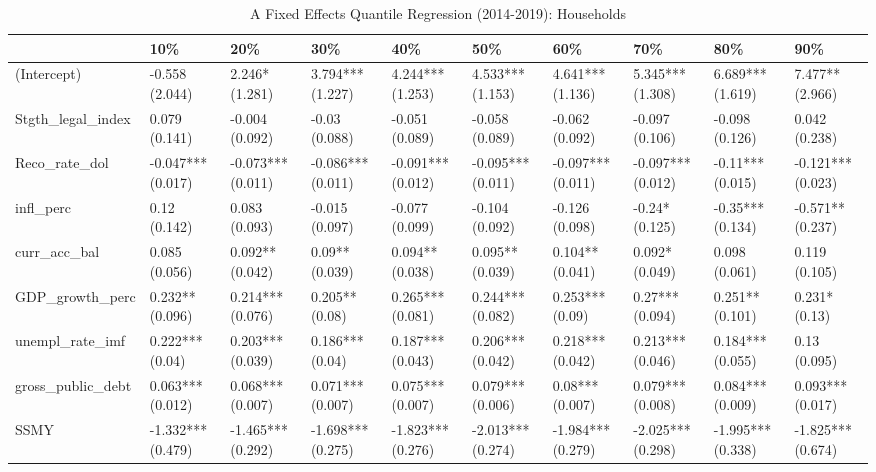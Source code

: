 \begin{table}[ht]
\centering
\caption{A Fixed Effects Quantile Regression (2014-2019): Households} 
\begingroup\small
\begin{tabular}{llllllllll}
  \toprule
 & 10\% & 20\% & 30\% & 40\% & 50\% & 60\% & 70\% & 80\% & 90\% \\ 
  \midrule
(Intercept) & -0.558 (2.044) & 2.246* (1.281) & 3.794*** (1.227) & 4.244*** (1.253) & 4.533*** (1.153) & 4.641*** (1.136) & 5.345*** (1.308) & 6.689*** (1.619) & 7.477** (2.966) \\ 
  Stgth\_legal\_index & 0.079 (0.141) & -0.004 (0.092) & -0.03 (0.088) & -0.051 (0.089) & -0.058 (0.089) & -0.062 (0.092) & -0.097 (0.106) & -0.098 (0.126) & 0.042 (0.238) \\ 
  Reco\_rate\_dol & -0.047*** (0.017) & -0.073*** (0.011) & -0.086*** (0.011) & -0.091*** (0.012) & -0.095*** (0.011) & -0.097*** (0.011) & -0.097*** (0.012) & -0.11*** (0.015) & -0.121*** (0.023) \\ 
  infl\_perc & 0.12 (0.142) & 0.083 (0.093) & -0.015 (0.097) & -0.077 (0.099) & -0.104 (0.092) & -0.126 (0.098) & -0.24* (0.125) & -0.35*** (0.134) & -0.571** (0.237) \\ 
  curr\_acc\_bal & 0.085 (0.056) & 0.092** (0.042) & 0.09** (0.039) & 0.094** (0.038) & 0.095** (0.039) & 0.104** (0.041) & 0.092* (0.049) & 0.098 (0.061) & 0.119 (0.105) \\ 
  GDP\_growth\_perc & 0.232** (0.096) & 0.214*** (0.076) & 0.205** (0.08) & 0.265*** (0.081) & 0.244*** (0.082) & 0.253*** (0.09) & 0.27*** (0.094) & 0.251** (0.101) & 0.231* (0.13) \\ 
  unempl\_rate\_imf & 0.222*** (0.04) & 0.203*** (0.039) & 0.186*** (0.04) & 0.187*** (0.043) & 0.206*** (0.042) & 0.218*** (0.042) & 0.213*** (0.046) & 0.184*** (0.055) & 0.13 (0.095) \\ 
  gross\_public\_debt & 0.063*** (0.012) & 0.068*** (0.007) & 0.071*** (0.007) & 0.075*** (0.007) & 0.079*** (0.006) & 0.08*** (0.007) & 0.079*** (0.008) & 0.084*** (0.009) & 0.093*** (0.017) \\ 
  SSMY & -1.332*** (0.479) & -1.465*** (0.292) & -1.698*** (0.275) & -1.823*** (0.276) & -2.013*** (0.274) & -1.984*** (0.279) & -2.025*** (0.298) & -1.995*** (0.338) & -1.825*** (0.674) \\ 
   \bottomrule
\end{tabular}
\endgroup
\end{table}
